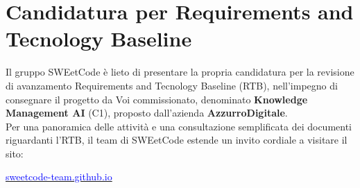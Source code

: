 \documentclass[10pt, a4paper]{article}
\title{\titolo}
\author{SWEetCode}
\begin{document}



\newpage
\section*{Candidatura per Requirements and Tecnology Baseline}
Il gruppo SWEetCode è lieto di presentare la propria candidatura per la revisione di avanzamento Requirements and Tecnology Baseline (RTB), nell'impegno di consegnare il progetto da Voi commissionato, denominato \textbf{Knowledge Management AI} (C1), proposto dall'azienda \textbf{AzzurroDigitale}.\\

Per una panoramica delle attività e una consultazione semplificata dei documenti riguardanti l'RTB, il team di SWEetCode estende un invito cordiale a visitare il sito:
\begin{center}
\href{https://sweetcode-team.github.io}{\textcolor{blue}{sweetcode-team.github.io}}
\end{center}
\end{document}
